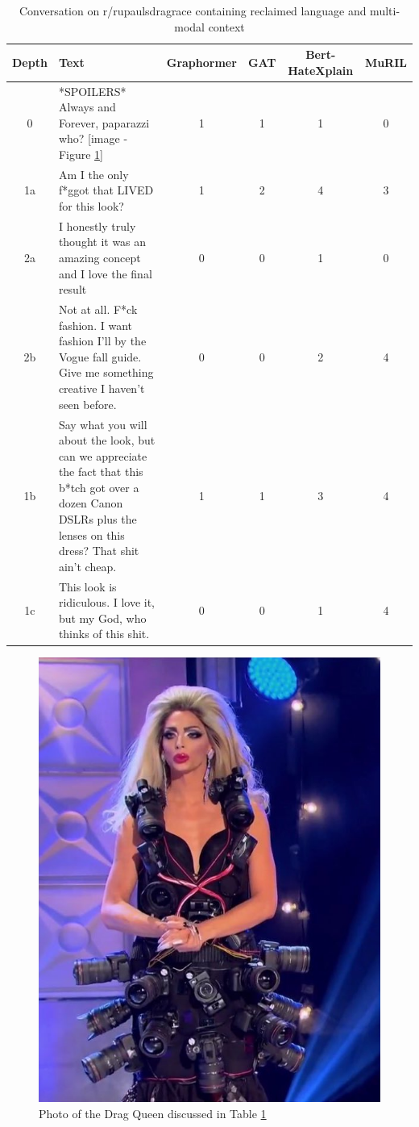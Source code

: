 \documentclass[letterpaper]{article} %
\begin{document}
\begin{table}
    \centering
        \caption{Conversation on r/rupaulsdragrace containing reclaimed language and multi-modal context}
    \begin{tabular}{c|p{8cm}|c|c|c|c}
        Depth & Text & Graphormer & GAT & Bert-HateXplain & MuRIL \\
        \hline
        \hline
        0 & *SPOILERS* Always and Forever, paparazzi who? [image - Figure \ref{fig:drag}] & 1 & 1 & 1 & 0 \\
        \hline
        1a & Am I the only f*ggot that LIVED for this look? & 1 & 2 & 4 & 3  \\
        \hline
        2a & I honestly truly thought it was an amazing concept and I love the final result & 0 & 0 & 1 & 0 \\
        \hline
        2b & Not at all. F*ck fashion. I want fashion I'll by the Vogue fall guide. Give me something creative I haven't seen before. & 0 & 0 & 2 & 4\\
        \hline
        1b & Say what you will about the look, but can we appreciate the fact that this b*tch got over a dozen Canon DSLRs plus the lenses on this dress? That shit ain't cheap. & 1 & 1 & 3 & 4 \\
        \hline
        1c & This look is ridiculous. I love it, but my God, who thinks of this shit. & 0 & 0 & 1 & 4
    \end{tabular}
    \label{tab:contextual-drag}
\end{table}

\begin{figure}
    \centering
    \includegraphics[width=0.55\linewidth]{drag.jpg}
    \caption{Photo of the Drag Queen discussed in Table \ref{tab:contextual-drag}}
    \label{fig:drag}
\end{figure}
\end{document}
